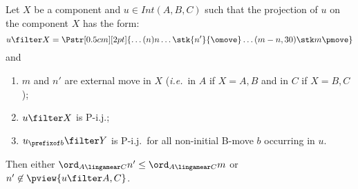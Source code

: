 \begin{lemma}
\label{lem:compos_auxiliary_lemma}
Let $X$ be a component and $u \in Int(A,B,C)$ such that
the projection of $u$ on the component $X$ has the form:
$$ u \filter X =
\Pstr[0.5cm][2pt]{ \ldots (n){n}  \ldots
 {\stk {n'}{\omove}}  \ldots  (m-n,30){\stk m {\pmove}}
}$$
and
\begin{enumerate}
  \item $m$ and $n'$ are external move in $X$ ({\it i.e.}~in $A$ if $X =A,B$ and in $C$ if $X=B,C$);
  \item $u\filter X$ is P-i.j.;
  \item $u_{\prefixof b}\filter Y$ is P-i.j.\ for all non-initial B-move $b$ occurring in $u$.
\end{enumerate}
Then either $\ord_{A\lingamear C} n' \leq \ord_{A\lingamear C} m$ or
$n' \not \in \pview{u\filter A,C}$.
\end{lemma}
